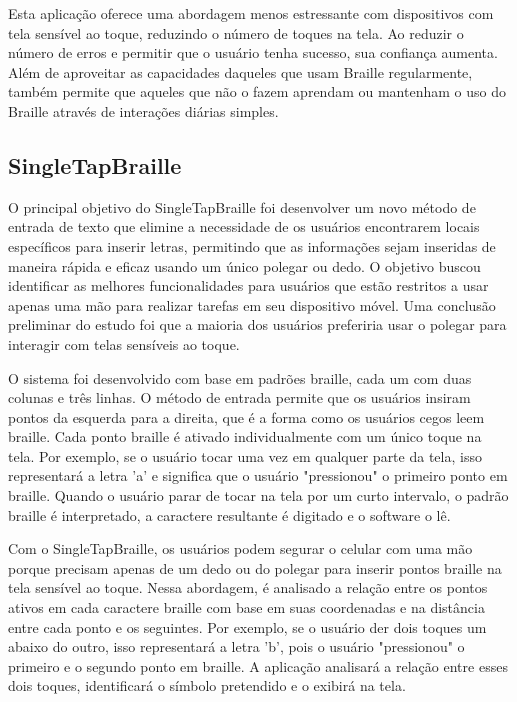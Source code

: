 Esta aplicação oferece uma abordagem menos estressante com dispositivos com tela sensível ao toque, reduzindo o número de toques na tela. Ao reduzir o número de erros e permitir que o usuário tenha sucesso, sua confiança aumenta. Além de aproveitar as capacidades daqueles que usam Braille regularmente, também permite que aqueles que não o fazem aprendam ou mantenham o uso do Braille através de interações diárias simples.

\subsection{SingleTapBraille}

O principal objetivo do SingleTapBraille \parencite{REF07} foi desenvolver um novo método de entrada de texto que elimine a necessidade de os usuários encontrarem locais específicos para inserir letras, permitindo que as informações sejam inseridas de maneira rápida e eficaz usando um único polegar ou dedo. O objetivo buscou identificar as melhores funcionalidades para usuários que estão restritos a usar apenas uma mão para realizar tarefas em seu dispositivo móvel. Uma conclusão preliminar do estudo foi que a maioria dos usuários preferiria usar o polegar para interagir com telas sensíveis ao toque.

O sistema foi desenvolvido com base em padrões braille, cada um com duas colunas e três linhas. O método de entrada permite que os usuários insiram pontos da esquerda para a direita, que é a forma como os usuários cegos leem braille. Cada ponto braille é ativado individualmente com um único toque na tela. Por exemplo, se o usuário tocar uma vez em qualquer parte da tela, isso representará a letra 'a' e significa que o usuário "pressionou" o primeiro ponto em braille. Quando o usuário parar de tocar na tela por um curto intervalo, o padrão braille é interpretado, a caractere resultante é digitado e o software o lê. 

Com o SingleTapBraille, os usuários podem segurar o celular com uma mão porque precisam apenas de um dedo ou do polegar para inserir pontos braille na tela sensível ao toque. Nessa abordagem, é analisado a relação entre os pontos ativos em cada caractere braille com base em suas coordenadas e na distância entre cada ponto e os seguintes. Por exemplo, se o usuário der dois toques um abaixo do outro, isso representará a letra 'b', pois o usuário "pressionou" o primeiro e o segundo ponto em braille. A aplicação analisará a relação entre esses dois toques, identificará o símbolo pretendido e o exibirá na tela.

